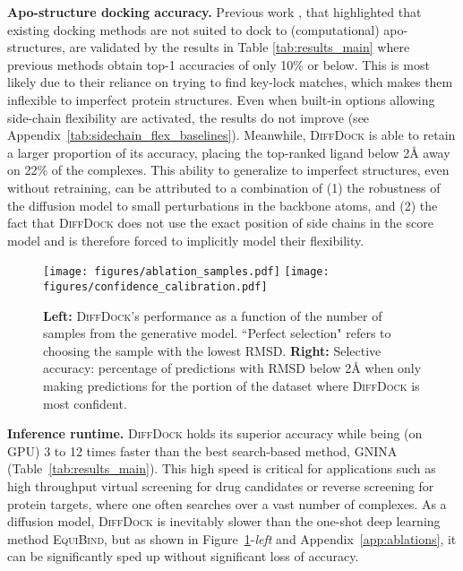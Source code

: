 \documentclass{article} \usepackage{iclr2023_conference,times}
\begin{document}
\textbf{Apo-structure docking accuracy.} Previous work \cite{wong2022benchmarking}, that highlighted that existing docking methods are not suited to dock to (computational) apo-structures, are validated by the results in Table \ref{tab:results_main} where previous methods obtain top-1 accuracies of only 10\% or below. This is most likely due to their reliance on trying to find key-lock matches, which makes them inflexible to imperfect protein structures. Even when built-in options allowing side-chain flexibility are activated, the results do not improve (see Appendix~\ref{tab:sidechain_flex_baselines}). Meanwhile, \textsc{DiffDock} is able to retain a larger proportion of its accuracy, placing the top-ranked ligand below 2\AA{} away on 22\% of the complexes. This ability to generalize to imperfect structures, even without retraining, can be attributed to a combination of (1) the robustness of the diffusion model to small perturbations in the backbone atoms, and (2) the fact that \textsc{DiffDock} does not use the exact position of side chains in the score model and is therefore forced to implicitly model their flexibility.




\begin{figure}[t]
\begin{center}
\texttt{[image: figures/ablation\_samples.pdf]}
\hspace{15pt}
\texttt{[image: figures/confidence\_calibration.pdf]}
\vspace{-6pt}
\caption{\textbf{Left:}  \textsc{DiffDock}'s performance as a function of the number of samples from the generative model. ``Perfect selection" refers to choosing the sample with the lowest RMSD. \textbf{Right:} Selective accuracy: percentage of predictions with RMSD below 2\AA{} when only making predictions for the portion of the dataset where \textsc{DiffDock} is most confident.} 
\label{fig:results_main}
\end{center}
\vspace{-15pt}
\end{figure}





\textbf{Inference runtime.} \textsc{DiffDock} holds its superior accuracy while being (on GPU) 3 to 12 times faster than the best search-based method, GNINA (Table~\ref{tab:results_main}). This high speed is critical for applications such as high throughput virtual screening for drug candidates or reverse screening for protein targets, where one often searches over a vast number of complexes. As a diffusion model, \textsc{DiffDock} is inevitably slower than the one-shot deep learning method \textsc{EquiBind}, but as shown in Figure~\ref{fig:results_main}-\textit{left} and Appendix~\ref{app:ablations}, it can be significantly sped up without significant loss of accuracy. 
\end{document}
